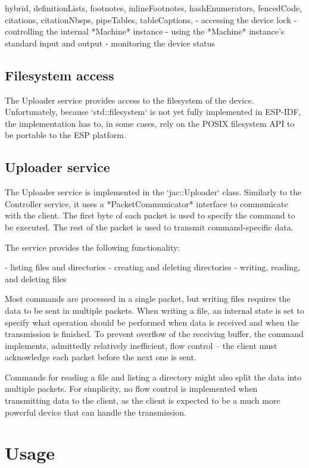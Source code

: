 \documentclass[
  digital,
  oneside,
  nosansbold,
  nocolorbold,
  lof,
  lot
]{fithesis4}
\begin{document}
\begin{markdown*}{%
  hybrid,
  definitionLists,
  footnotes,
  inlineFootnotes,
  hashEnumerators,
  fencedCode,
  citations,
  citationNbsps,
  pipeTables,
  tableCaptions,
}
  - accessing the device lock
  - controlling the internal *Machine* instance
  - using the *Machine* instance's standard input and output
  - monitoring the device status

\subsection{Filesystem access}

The Uploader service provides access to the filesystem of the device. Unfortunately, because `std::filesystem` is not yet fully implemented in ESP-IDF, the implementation has to, in some cases, rely on the POSIX filesystem API to be portable to the ESP platform.

\subsection{Uploader service}

The Uploader service is implemented in the `jac::Uploader` class. Similarly to the Controller service, it uses a *PacketCommunicator* interface to communicate with the client. The first byte of each packet is used to specify the command to be executed. The rest of the packet is used to transmit command-specific data.

The service provides the following functionality:

  - listing files and directories
  - creating and deleting directories
  - writing, reading, and deleting files

Most commands are processed in a single packet, but writing files requires the data to be sent in multiple packets. When writing a file, an internal state is set to specify what operation should be performed when data is received and when the transmission is finished. To prevent overflow of the receiving buffer, the command implements, admittedly relatively inefficient, flow control -- the client must acknowledge each packet before the next one is sent.

Commands for reading a file and listing a directory might also split the data into multiple packets. For simplicity, no flow control is implemented when transmitting data to the client, as the client is expected to be a much more powerful device that can handle the transmission.


\section{Usage}


\end{markdown*}
\end{document}
